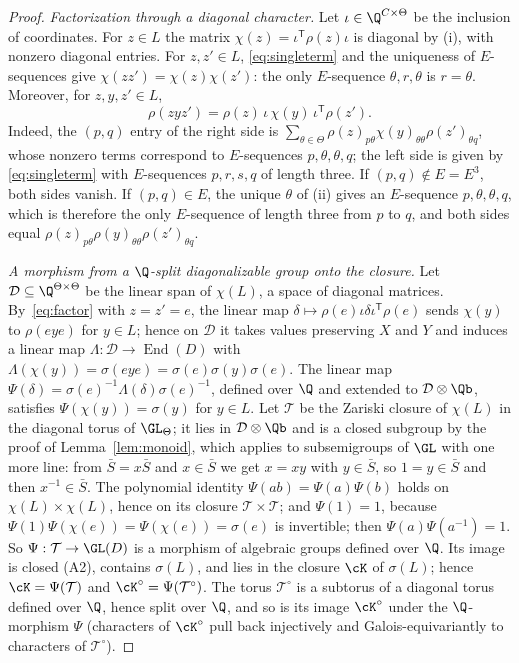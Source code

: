\begin{proof}
\emph{Factorization through a diagonal character.} Let $\iota\in\Q^{C\times\Theta}$ be the inclusion of
coordinates. For $z\in L$ the matrix $\chi(z)=\iota^{\mathsf T}\rho(z)\iota$ is diagonal by (i), with
nonzero diagonal entries. For $z,z'\in L$, \eqref{eq:singleterm} and the uniqueness of
$E$-sequences give $\chi(zz')=\chi(z)\chi(z')$: the only $E$-sequence $\theta,r,\theta$ is $r=\theta$. Moreover, for
$z,y,z'\in L$,
\begin{equation}\label{eq:factor}
\rho(zyz')=\rho(z)\,\iota\,\chi(y)\,\iota^{\mathsf T}\rho(z').
\end{equation}
Indeed, the $(p,q)$ entry of the right side is $\sum_{\theta\in\Theta}\rho(z)_{p\theta}\chi(y)_{\theta\theta}\rho(z')_{\theta q}$,
whose nonzero terms correspond to $E$-sequences $p,\theta,\theta,q$; the left side is given by
\eqref{eq:singleterm} with $E$-sequences $p,r,s,q$ of length three. If $(p,q)\notin E=E^3$, both sides
vanish. If $(p,q)\in E$, the unique $\theta$ of (ii) gives an $E$-sequence $p,\theta,\theta,q$, which is therefore
the only $E$-sequence of length three from $p$ to $q$, and both sides equal
$\rho(z)_{p\theta}\rho(y)_{\theta\theta}\rho(z')_{\theta q}$.

\emph{A morphism from a $\Q$-split diagonalizable group onto the closure.} Let $\mathcal D\subseteq\Q^{\Theta\times\Theta}$ be
the linear span of $\chi(L)$, a space of diagonal matrices. By~\eqref{eq:factor} with $z=z'=e$, the
linear map $\delta\mapsto\rho(e)\iota\delta\iota^{\mathsf T}\rho(e)$ sends $\chi(y)$ to $\rho(eye)$ for
$y\in L$; hence on $\mathcal D$ it takes values preserving $X$ and $Y$ and induces a linear map
$\Lambda:\mathcal D\to\operatorname{End}(D)$ with $\Lambda(\chi(y))=\sigma(eye)=\sigma(e)\sigma(y)\sigma(e)$.
The linear map $\Psi(\delta)=\sigma(e)^{-1}\Lambda(\delta)\sigma(e)^{-1}$, defined over $\Q$ and
extended to $\mathcal D\otimes\Qb$, satisfies $\Psi(\chi(y))=\sigma(y)$ for $y\in L$. Let $\mathcal T$
be the Zariski closure of $\chi(L)$ in the diagonal torus of $\GL_{\Theta}$; it lies in
$\mathcal D\otimes\Qb$ and is a closed subgroup by the proof of Lemma~\ref{lem:monoid}, which applies to
subsemigroups of $\GL$ with one more line: from $\bar S=x\bar S$ and $x\in\bar S$ we get $x=xy$ with
$y\in\bar S$, so $1=y\in\bar S$ and then $x^{-1}\in\bar S$. The polynomial identity $\Psi(ab)=\Psi(a)\Psi(b)$ holds on
$\chi(L)\times\chi(L)$, hence on its closure $\mathcal T\times\mathcal T$; and $\Psi(1)=1$, because
$\Psi(1)\Psi(\chi(e))=\Psi(\chi(e))=\sigma(e)$ is invertible; then $\Psi(a)\Psi(a^{-1})=1$. So $\Psi:\mathcal T\to\GL(D)$ is a
morphism of algebraic groups defined over $\Q$. Its image is closed (A2), contains $\sigma(L)$, and
lies in the closure $\cK$ of $\sigma(L)$; hence $\cK=\Psi(\mathcal T)$ and $\cK^\circ=\Psi(\mathcal T^\circ)$.
The torus $\mathcal T^\circ$ is a subtorus of a diagonal torus defined over $\Q$, hence split over $\Q$,
and so is its image $\cK^\circ$ under the $\Q$-morphism $\Psi$ (characters of $\cK^\circ$ pull back
injectively and Galois-equivariantly to characters of $\mathcal T^\circ$).


\end{proof}
